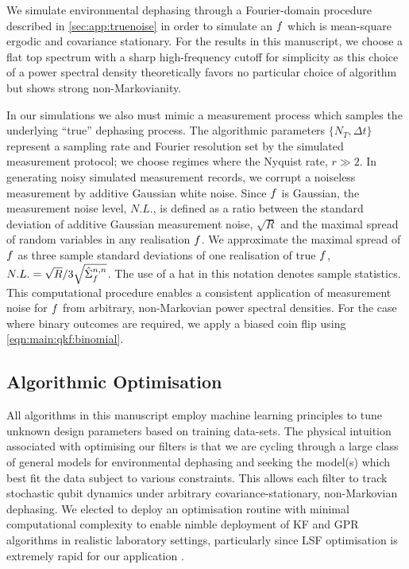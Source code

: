 We simulate environmental dephasing through a Fourier-domain procedure described in \cref{sec:app:truenoise} \cite{soare2014} in order to simulate an $f$ which is mean-square ergodic and covariance stationary.  For the results in this manuscript, we choose a flat top spectrum with a sharp high-frequency cutoff for simplicity as this choice of a power spectral density theoretically favors no particular choice of algorithm but shows strong non-Markovianity. 

In our simulations we also must mimic a measurement process which samples the underlying ``true'' dephasing process.  The algorithmic parameters $\{N_T, \Delta t\} $ represent a sampling rate and Fourier resolution set by the simulated measurement protocol; we choose regimes where the Nyquist rate, $r \gg 2$. In generating noisy simulated measurement records, we corrupt a noiseless measurement by additive Gaussian white noise. Since $f$ is Gaussian, the measurement noise level, $N.L.$, is defined as a ratio between the standard deviation of additive Gaussian measurement noise, $\sqrt{R}$ and the maximal spread of random variables in any realisation $f$. We approximate the maximal spread of $f$ as three sample standard deviations of one realisation of true $f$, $N.L. = \sqrt{R}/3\sqrt{\hat{\Sigma}_f^{n,n}}$. The use of a hat in this notation denotes sample statistics. This computational procedure enables a consistent application of measurement noise for $f$ from arbitrary, non-Markovian power spectral densities. For the case where binary outcomes are required, we apply a biased coin flip using \cref{eqn:main:qkf:binomial}.

\subsection{Algorithmic Optimisation \label{sec:main:Optimisation}}

All algorithms in this manuscript employ machine learning principles to tune unknown design parameters based on training data-sets. The physical intuition associated with optimising our filters is that we are cycling through a large class of general models for environmental dephasing and seeking the model(s) which best fit the data subject to various constraints. This allows each filter to track stochastic qubit dynamics under arbitrary covariance-stationary, non-Markovian dephasing.  We elected to deploy an optimisation routine with minimal computational complexity to enable nimble deployment of KF and GPR algorithms in realistic laboratory settings, particularly since LSF optimisation is extremely rapid for our application \cite{mavadia2017}. 

